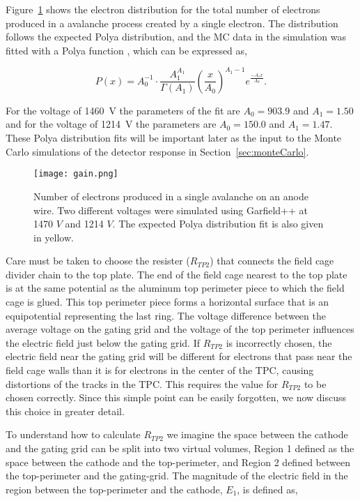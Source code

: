  Figure~\ref{fig:anodegain} shows the electron distribution for the total number of electrons produced in a avalanche process created by a single electron. The distribution follows the expected Polya distribution, and the MC data in the simulation was fitted with a Polya function \cite{blumrol}, which can be expressed as,

\begin{equation}
P(x) = A_0^{-1}\cdot \frac{A_1^{A_1}}{\Gamma(A_1)} \left(\frac{x}{A_0}\right)^{A_1-1}e^{\frac{-A_1x}{A_0}}.
\end{equation}

For the voltage of \SI{1460}{\volt} the parameters of the fit are $A_0=903.9$ and $A_1=1.50$ and for the voltage of \SI{1214}{\volt} the parameters are $A_0=150.0$ and $A_1=1.47$. These Polya distribution fits will be important later as the input to the Monte Carlo simulations of the detector response in Section~\ref{sec:monteCarlo}.



\begin{figure}[!htb]
\texttt{[image: gain.png]}
\caption{Number of electrons produced in a single avalanche on an anode wire. Two different voltages were simulated using Garfield++ at 1470 $V$ and 1214 $V$. The expected Polya distribution fit is also given in yellow.}
\label{fig:anodegain}
\end{figure}



Care must be taken to choose the resister ($R_{TP2}$) that connects the field cage divider chain to the top plate. The end of the field cage nearest to the top plate is at the same potential as the aluminum top perimeter piece to which the field cage is glued. This top perimeter piece forms a horizontal surface that is an equipotential representing the last ring. The voltage difference between the average voltage on  the gating grid and the voltage of the top perimeter influences the electric field just below the gating grid. If $R_{TP2}$ is incorrectly chosen, the electric field near the gating grid will be different for electrons that pass near the field cage walls than it is for electrons in the center of the TPC,  causing distortions of the tracks in the TPC. This requires the value for $R_{TP2}$ to be chosen correctly. Since this simple point can be easily forgotten, we now discuss this choice in greater detail.

To understand how to calculate $R_{TP2}$ we imagine the space between the cathode and the gating grid can be split into two virtual volumes, Region 1 defined as the space between the cathode and the top-perimeter, and Region 2 defined between the top-perimeter and the gating-grid. The magnitude of the electric field in the region between the top-perimeter and the cathode, $E_1$, is defined as,

